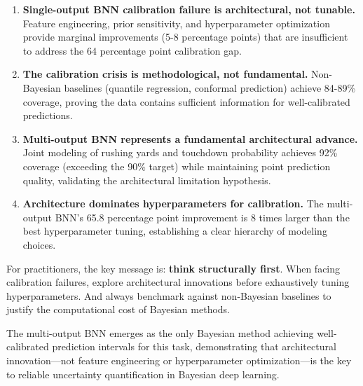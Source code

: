 \begin{enumerate}
    \item \textbf{Single-output BNN calibration failure is architectural, not tunable.} Feature engineering, prior sensitivity, and hyperparameter optimization provide marginal improvements (5-8 percentage points) that are insufficient to address the 64 percentage point calibration gap.

    \item \textbf{The calibration crisis is methodological, not fundamental.} Non-Bayesian baselines (quantile regression, conformal prediction) achieve 84-89\% coverage, proving the data contains sufficient information for well-calibrated predictions.

    \item \textbf{Multi-output BNN represents a fundamental architectural advance.} Joint modeling of rushing yards and touchdown probability achieves 92\% coverage (exceeding the 90\% target) while maintaining point prediction quality, validating the architectural limitation hypothesis.

    \item \textbf{Architecture dominates hyperparameters for calibration.} The multi-output BNN's 65.8 percentage point improvement is 8 times larger than the best hyperparameter tuning, establishing a clear hierarchy of modeling choices.
\end{enumerate}

For practitioners, the key message is: \textbf{think structurally first}. When facing calibration failures, explore architectural innovations before exhaustively tuning hyperparameters. And always benchmark against non-Bayesian baselines to justify the computational cost of Bayesian methods.

The multi-output BNN emerges as the only Bayesian method achieving well-calibrated prediction intervals for this task, demonstrating that architectural innovation—not feature engineering or hyperparameter optimization—is the key to reliable uncertainty quantification in Bayesian deep learning.
